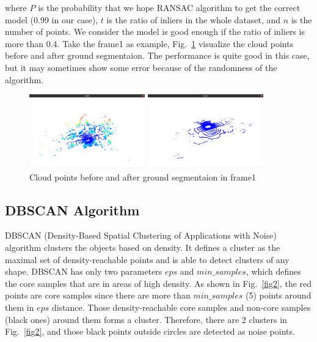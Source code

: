 \documentclass[10pt]{article}
\theoremstyle{nonumberplain}
\begin{document}
where $P$ is the probability that we hope RANSAC algorithm to get the correct model (0.99 in our case), $t$ is the ratio of inliers in the whole dataset, and $n$ is the number of points. We consider the model is good enough if the ratio of inliers is more than 0.4. Take the frame1 as example, Fig.~\ref{fig1} visualize the cloud points before and after ground segmentaion. The performance is quite good in this case, but it may sometimes show some error because of the randomness of the algorithm.

\begin{figure}[H]
	\centering
	\begin{minipage}[t]{0.4\textwidth}
		\centering
		\includegraphics[width=5cm]{fig1a.png}
	\end{minipage}
	\begin{minipage}[t]{0.4\textwidth}
		\centering
		\includegraphics[width=5cm]{fig1b.png}
	\end{minipage}
	\caption{Cloud points before and after ground segmentaion in frame1}
	\label{fig1}
\end{figure} 



\subsection{DBSCAN Algorithm}

\hspace{1.0em}
DBSCAN (Density-Based Spatial Clustering of Applications with Noise) algorithm clusters the objects based on density. It defines a cluster as the maximal set of density-reachable points and is able to detect clusters of any shape. DBSCAN has only two parameters $eps$ and $min\_samples$, which defines the core samples that are in areas of high density. As shown in Fig.~\ref{fig2}, the red points are core samples since there are more than $min\_samples$ (5) points around them in $eps$ distance. Those density-reachable core samples and non-core samples (black ones) around them forms a cluster. Therefore, there are 2 clusters in Fig.~\ref{fig2}, and those black points outside circles are detected as noise points.
\end{document}
